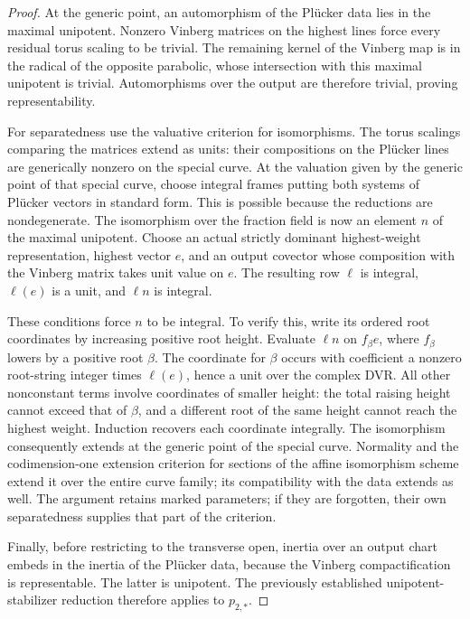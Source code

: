 \documentclass[11pt]{article}
\numberwithin{equation}{section}
\theoremstyle{definition}
\theoremstyle{remark}
\begin{document}
\begin{proof}
At the generic point, an automorphism of the Pl\"ucker data
lies in the maximal unipotent.  Nonzero Vinberg matrices on
the highest lines force every residual torus scaling to be
trivial.  The remaining kernel of the Vinberg map is in the
radical of the opposite parabolic, whose intersection with
this maximal unipotent is trivial.  Automorphisms over the
output are therefore trivial, proving representability.

For separatedness use the valuative criterion for isomorphisms.
The torus scalings comparing the matrices extend as units:
their compositions on the Pl\"ucker lines are generically
nonzero on the special curve.  At the valuation given by the
generic point of that special curve, choose integral frames
putting both systems of Pl\"ucker vectors in standard form.
This is possible because the reductions are nondegenerate.
The isomorphism over the fraction field is now an element
$n$ of the maximal unipotent.  Choose an actual strictly
dominant highest-weight representation, highest vector $e$,
and an output covector whose composition with the Vinberg
matrix takes unit value on $e$.  The resulting row $\ell$
is integral, $\ell(e)$ is a unit, and $\ell n$ is integral.

These conditions force $n$ to be integral.  To verify this,
write its ordered root coordinates by increasing positive
root height.  Evaluate $\ell n$ on $f_\beta e$, where
$f_\beta$ lowers by a positive root $\beta$.  The coordinate
for $\beta$ occurs with coefficient a nonzero root-string
integer times $\ell(e)$, hence a unit over the complex DVR.
All other nonconstant terms involve coordinates of smaller
height: the total raising height cannot exceed that of
$\beta$, and a different root of the same height cannot
reach the highest weight.  Induction recovers each
coordinate integrally.  The isomorphism consequently
extends at the generic point of the special curve.
Normality and the codimension-one extension criterion for
sections of the affine isomorphism scheme extend it over
the entire curve family; its compatibility with the data
extends as well.  The argument retains marked parameters;
if they are forgotten, their own separatedness supplies
that part of the criterion.

Finally, before restricting to the transverse open, inertia
over an output chart embeds in the inertia of the
Pl\"ucker data, because the Vinberg compactification is
representable.  The latter is unipotent.  The previously
established unipotent-stabilizer reduction therefore
applies to $p_{2,*}$.
\end{proof}
\end{document}
